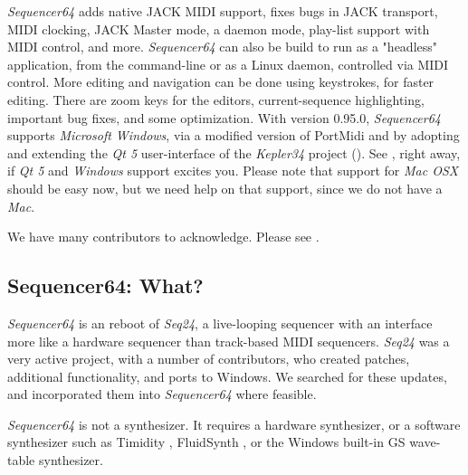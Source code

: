 \documentclass[
 11pt,
 twoside,
 a4paper,
 headinclude,
 footinclude,
 final                                 %
]{article}
\begin{document}
   \textsl{Sequencer64} adds native JACK MIDI support,
   fixes bugs in JACK transport, MIDI clocking,
   JACK Master mode,
   a daemon mode, play-list support with MIDI control,
   and more.
   \textsl{Sequencer64} can also be build to run as a "headless" application,
   from the command-line or as a Linux daemon, controlled via MIDI control.
   More editing and navigation can be done using keystrokes,
   for faster editing.
   There are zoom keys for the editors, current-sequence highlighting,
   important bug fixes, and some optimization.
   With version 0.95.0, \textsl{Sequencer64} supports
   \textsl{Microsoft Windows}, via 
   a modified version of PortMidi and by
   adopting and extending the \textsl{Qt 5} user-interface of the
   \textsl{Kepler34} project (\cite{kepler34}).
   See , right away, if \textsl{Qt 5} and
   \textsl{Windows} support excites you.
   Please note that support for \textsl{Mac OSX} should be easy now,
   but we need help on that support, since we do not have a \textsl{Mac}.

   We have many contributors to acknowledge.  Please see
   .

\subsection{Sequencer64: What?}
\label{subsec:what_is_sequencer64}

   \textsl{Sequencer64} is an reboot of \textsl{Seq24},
   a live-looping sequencer with an interface more like a hardware sequencer
   than track-based MIDI sequencers.
   \textsl{Seq24} was a very active project, with a
   number of contributors, who created patches, additional
   functionality, and ports to Windows.
   We searched for these updates, and
   incorporated them into \textsl{Sequencer64} where feasible.

   \textsl{Sequencer64} is not a synthesizer.  It requires a hardware
   synthesizer, or a software synthesizer such as Timidity \cite{timidity},
   FluidSynth \cite{fluidsynth}, or
   the Windows built-in GS wave-table synthesizer.
\end{document}
